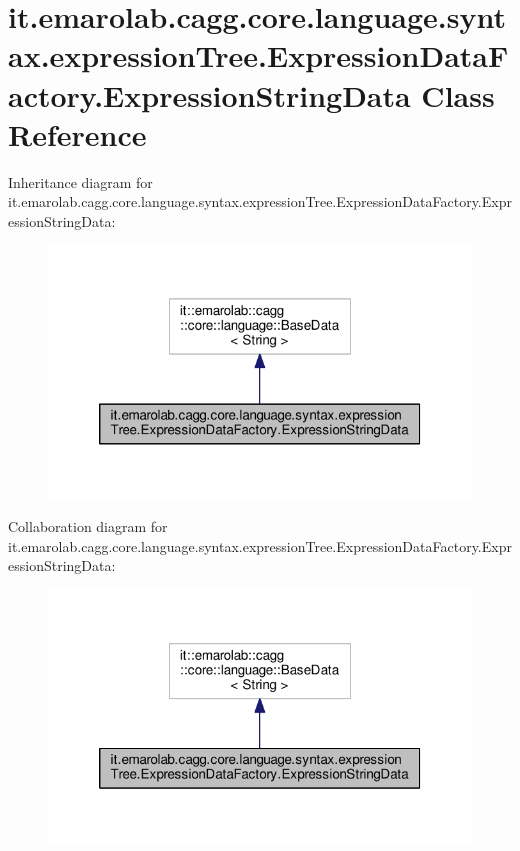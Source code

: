 \hypertarget{classit_1_1emarolab_1_1cagg_1_1core_1_1language_1_1syntax_1_1expressionTree_1_1ExpressionDataFactory_1_1ExpressionStringData}{\section{it.\-emarolab.\-cagg.\-core.\-language.\-syntax.\-expression\-Tree.\-Expression\-Data\-Factory.\-Expression\-String\-Data Class Reference}
\label{classit_1_1emarolab_1_1cagg_1_1core_1_1language_1_1syntax_1_1expressionTree_1_1ExpressionDataFactory_1_1ExpressionStringData}
}


Inheritance diagram for it.\-emarolab.\-cagg.\-core.\-language.\-syntax.\-expression\-Tree.\-Expression\-Data\-Factory.\-Expression\-String\-Data\-:\nopagebreak
\begin{figure}[H]
\begin{center}
\leavevmode
\includegraphics[width=318pt]{classit_1_1emarolab_1_1cagg_1_1core_1_1language_1_1syntax_1_1expressionTree_1_1ExpressionDataFac168938fa1cf79e56c1797c078addcf70}
\end{center}
\end{figure}


Collaboration diagram for it.\-emarolab.\-cagg.\-core.\-language.\-syntax.\-expression\-Tree.\-Expression\-Data\-Factory.\-Expression\-String\-Data\-:\nopagebreak
\begin{figure}[H]
\begin{center}
\leavevmode
\includegraphics[width=318pt]{classit_1_1emarolab_1_1cagg_1_1core_1_1language_1_1syntax_1_1expressionTree_1_1ExpressionDataFac17a9cb5a774789e8085ae1588cfc3480}
\end{center}
\end{figure}
